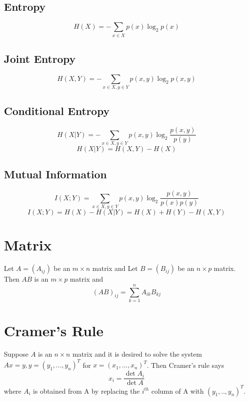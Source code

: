 \documentclass[twocolumn]{article}
\begin{document}
\subsection{Entropy}
\[H(X) = -\sum_{x \in X} p(x)\log_2p(x)\]

\subsection{Joint Entropy}
\[H(X,Y) = -\sum_{x \in X, y \in Y} p(x,y) \log_2p(x,y)\]

\subsection{Conditional Entropy}
\[H(X|Y) = -\sum_{x \in X, y \in Y} p(x,y) \log_2 \frac{p(x,y)}{p(y)}\]
\[H(X|Y) = H(X,Y) - H(X)\]

\subsection{Mutual Information}
\[I(X;Y) = \sum_{x \in X, y \in Y}p(x,y) \log_2 \frac{p(x,y)}{p(x)p(y)}\]
\[I(X;Y) = H(X) - H(X|Y) = H(X) + H(Y) - H(X,Y)\]

\section{Matrix}
Let $A = (A_{ij})$ be an $m \times n$ matrix and Let $B = (B_{ij})$ be an $n \times p$ matrix.
Then $AB$ is an $m \times p$ matrix and
\[
	(AB)_{ij} = \sum_{k=1}^n A_{ik}B_{kj}
\]

\section{Cramer's Rule}
Suppose $A$ is an $n \times n$ matrix and it is desired to solve the system $Ax=y, y=(y_1,...,y_n)^T$ for $x = (x_1,...,x_n)^T$. Then Cramer's rule says
\[
	x_i = \frac{\det A_i}{\det A}
\]
where $A_i$ is obtained from A by replacing the $i^{th}$ column of A with $(y_1,..,y_n)^T$.
\end{document}
